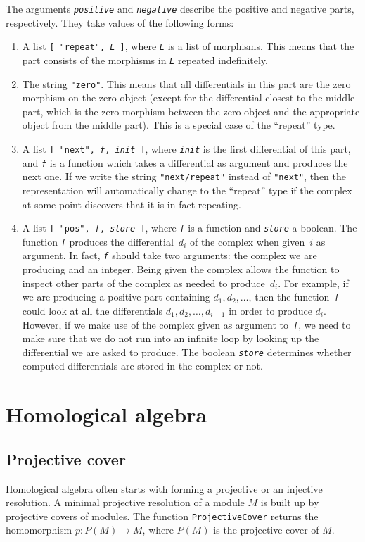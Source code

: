 \documentclass{amsart}
\theoremstyle{definition}
\newcommand{\code}[1]{\texttt{#1}}
\newcommand{\Arg}[1]{\texttt{\textit{#1}}}
\theoremstyle{theoretic}
\begin{document}
The arguments \Arg{positive} and \Arg{negative} describe the positive
and negative parts, respectively.  They take values of the following
forms:
\begin{enumerate}
\item A list \code{[ "repeat", \Arg{L} ]}, where \Arg{L} is a list of
morphisms.  This means that the part consists of the morphisms in
\Arg{L} repeated indefinitely.
\item The string \code{"zero"}.  This means that all differentials in
this part are the zero morphism on the zero object (except for the
differential closest to the middle part, which is the zero morphism
between the zero object and the appropriate object from the middle
part).  This is a special case of the ``repeat'' type.
\item A list \code{[ "next", \Arg{f}, \Arg{init} ]}, where \Arg{init}
is the first differential of this part, and \Arg{f} is a function
which takes a differential as argument and produces the next one.  If
we write the string \code{"next/repeat"} instead of \code{"next"},
then the representation will automatically change to the ``repeat''
type if the complex at some point discovers that it is in fact
repeating.
\item A list \code{[ "pos", \Arg{f}, \Arg{store} ]}, where \Arg{f} is
a function and \Arg{store} a boolean.  The function \Arg{f} produces
the differential~$d_i$ of the complex when given~$i$ as argument.  In
fact, \Arg{f} should take two arguments: the complex we are producing
and an integer.  Being given the complex allows the function to
inspect other parts of the complex as needed to produce~$d_i$.  For
example, if we are producing a positive part containing $d_1, d_2,
\ldots$, then the function~\Arg{f} could look at all the differentials
$d_1, d_2, \ldots, d_{i-1}$ in order to produce $d_i$.  However, if we
make use of the complex given as argument to~\Arg{f}, we need to make
sure that we do not run into an infinite loop by looking up the
differential we are asked to produce.  The boolean \Arg{store}
determines whether computed differentials are stored in the complex or
not.
\end{enumerate}


\section{Homological algebra}
\subsection{Projective cover}
Homological algebra often starts with forming a projective or an
injective resolution.  A minimal projective resolution of a module $M$
is built up by projective covers of modules.  The function
\code{ProjectiveCover} returns the homomorphism $p\colon P(M)\to M$,
where $P(M)$ is the projective cover of $M$.  
\end{document}
